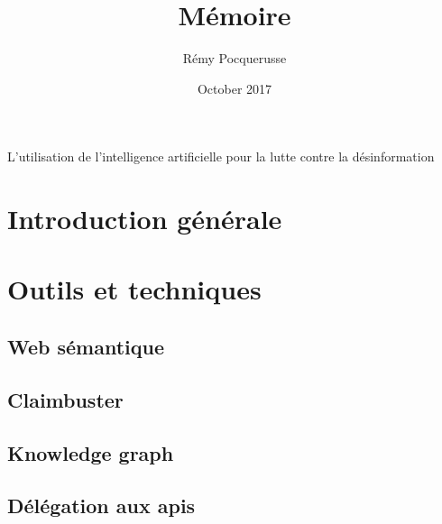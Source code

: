 \documentclass[12pt]{article}
\title{Mémoire}
\author{Rémy Pocquerusse}
\date{October 2017}
\begin{document}
\maketitle

\par\hfil\null\par
\par\hfil\null\par
\par\hfil\null\par

\begin{center}
{\huge L'utilisation de l'intelligence artificielle pour la lutte contre la désinformation}
\end{center}

\clearpage

\renewcommand*\contentsname{Sommaire}

\clearpage

\tableofcontents

\clearpage

\section{Introduction générale}



\section{Outils et techniques}

\subsection{Web sémantique}



\subsection{Claimbuster}



\subsection{Knowledge graph}



\subsection{Délégation aux apis}
\end{document}
